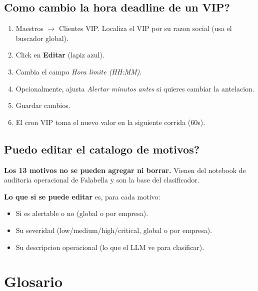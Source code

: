 \documentclass[11pt,a4paper]{article}
\begin{document}
\subsection{Como cambio la hora deadline de un VIP?}

\begin{enumerate}
  \item Maestros $\rightarrow$ Clientes VIP. Localiza el VIP por su
        razon social (usa el buscador global).
  \item Click en \textbf{Editar} (lapiz azul).
  \item Cambia el campo \emph{Hora limite (HH:MM)}.
  \item Opcionalmente, ajusta \emph{Alertar minutos antes} si quieres
        cambiar la antelacion.
  \item Guardar cambios.
  \item El cron VIP toma el nuevo valor en la siguiente corrida (60s).
\end{enumerate}

\subsection{Puedo editar el catalogo de motivos?}

\textbf{Los 13 motivos no se pueden agregar ni borrar.} Vienen del
notebook de auditoria operacional de Falabella y son la base del
clasificador.

\textbf{Lo que si se puede editar} es, para cada motivo:
\begin{itemize}
  \item Si es alertable o no (global o por empresa).
  \item Su severidad (low/medium/high/critical, global o por empresa).
  \item Su descripcion operacional (lo que el LLM ve para clasificar).
\end{itemize}

\section{Glosario}
\end{document}
